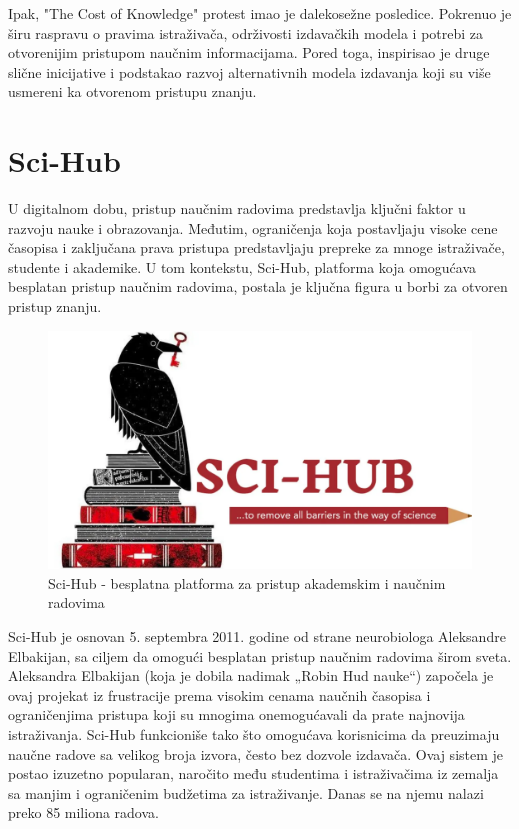 \documentclass{article}
\begin{document}
Ipak, "The Cost of Knowledge" protest imao je dalekosežne posledice. Pokrenuo je širu raspravu o pravima istraživača, održivosti izdavačkih modela i potrebi za otvorenijim pristupom naučnim informacijama. Pored toga, inspirisao je druge slične inicijative i podstakao razvoj alternativnih modela izdavanja koji su više usmereni ka otvorenom pristupu znanju.


\section{Sci-Hub}

U digitalnom dobu, pristup naučnim radovima predstavlja ključni faktor u razvoju nauke i obrazovanja. Međutim, ograničenja koja postavljaju visoke cene časopisa i zaključana prava pristupa predstavljaju prepreke za mnoge istraživače, studente i akademike. U tom kontekstu, Sci-Hub, platforma koja omogućava besplatan pristup naučnim radovima, postala je ključna figura u borbi za otvoren pristup znanju.

\begin{figure}
    \centering
    \includegraphics[width=0.75\linewidth]{img/sci-hub.png}
    \caption{Sci-Hub - besplatna platforma za pristup akademskim i naučnim radovima}
\end{figure}

Sci-Hub je osnovan 5. septembra 2011. godine od strane neurobiologa Aleksandre Elbakijan, sa ciljem da omogući besplatan pristup naučnim radovima širom sveta. Aleksandra Elbakijan (koja je dobila nadimak „Robin Hud nauke“) započela je ovaj projekat iz frustracije prema visokim cenama naučnih časopisa i ograničenjima pristupa koji su mnogima onemogućavali da prate najnovija istraživanja. Sci-Hub funkcioniše tako što omogućava korisnicima da preuzimaju naučne radove sa velikog broja izvora, često bez dozvole izdavača. Ovaj sistem je postao izuzetno popularan, naročito među studentima i istraživačima iz zemalja sa manjim i ograničenim budžetima za istraživanje. Danas se na njemu nalazi preko 85 miliona radova.
\end{document}
